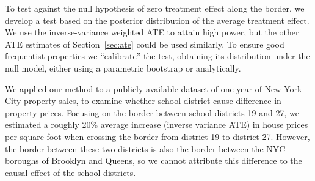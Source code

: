 \documentclass[letter,12pt]{article}
\begin{document}
To test against the null hypothesis of zero treatment effect along the border, we develop a test based on the posterior distribution of the average treatment effect.
We use the inverse-variance weighted ATE to attain high power, but the other ATE estimates of Section~\ref{sec:ate} could be used similarly.
To ensure good frequentist properties we “calibrate” the test, obtaining its distribution under the null model, either using a parametric bootstrap or analytically.

We applied our method to a publicly available dataset of one year of New York City property sales, to examine whether school district cause difference in property prices.
Focusing on the border between school districts 19 and 27, we estimated a roughly 20\% average increase (inverse variance ATE) in house prices per square foot when crossing the border from district 19 to district 27.
However, the border between these two districts is also the border between the NYC boroughs of Brooklyn and Queens, so we cannot attribute this difference to the causal effect of the school districts.
\end{document}
